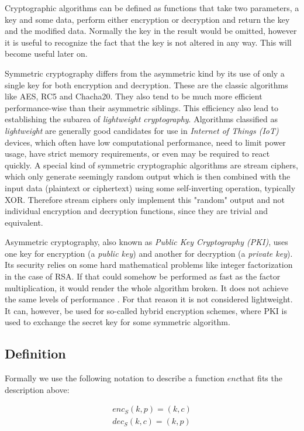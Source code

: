 \documentclass[a4paper,10pt,openright]{memoir}
\def\enc{\ensuremath{\mathit{enc}}}
\def\dec{\ensuremath{\mathit{dec}}}
\newcommand{\term}[1]{\textit{#1}}
\begin{document}
Cryptographic algorithms can be defined as functions that take two 
parameters, a key and some data, perform either encryption or 
decryption and return the key and the modified data. Normally the key 
in the result would be omitted, however it is useful to recognize the 
fact that the key is not altered in any way. This will become useful 
later on.

Symmetric cryptography differs from the asymmetric kind by its use of 
only a single key for both encryption and decryption. These are the 
classic algorithms like AES, RC5 and Chacha20. They also tend to be 
much more efficient performance-wise than their asymmetric siblings. 
This efficiency also lead to establishing the subarea of 
\term{lightweight cryptography}. Algorithms classified as 
\term{lightweight} are generally good candidates for use in 
\term{Internet of Things (IoT)} devices, which often have low 
computational performance, need to limit power usage, have strict 
memory requirements, or even may be required to react quickly. A 
special kind of symmetric cryptographic algorithms are stream ciphers, 
which only generate seemingly random output which is then combined with 
the input data (plaintext or ciphertext) using some self-inverting 
operation, typically XOR. Therefore stream ciphers only implement this 
"random" output and not individual encryption and decryption functions, 
since they are trivial and equivalent.

Asymmetric cryptography, also known as \term{Public Key Cryptography 
(PKI)}, uses one key for encryption (a \term{public key}) and another 
for decryption (a \term{private key}). Its security relies on some hard 
mathematical problems like integer factorization in the case of RSA. If 
that could somehow be performed as fast as the factor multiplication, 
it would render the whole algorithm broken. It does not achieve the 
same levels of performance . For that reason it 
is not considered lightweight. It can, however, be used for so-called 
hybrid encryption schemes, where PKI is used to exchange the secret key 
for some symmetric algorithm.

\subsection{Definition}

Formally we use the following notation to describe a function 
\enc that fits the description above:

\begin{align*}
\enc_S(k,p) = (k,c) \\
\dec_S(k,c) = (k,p) 
\end{align*}
\end{document}
